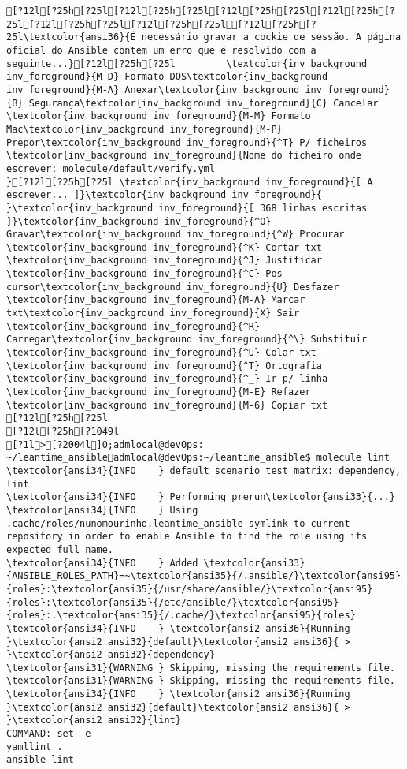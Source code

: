 \documentclass{scrartcl}
\begin{document}
\begin{Verbatim}
[?12l[?25h[?25l[?12l[?25h[?25l[?12l[?25h[?25l[?12l[?25h[?25l[?12l[?25h[?25l[?12l[?25h[?25l[?12l[?25h[?25l\textcolor{ansi36}{É necessário gravar a cockie de sessão. A página oficial do Ansible contem um erro que é resolvido com a seguinte...}[?12l[?25h[?25l         \textcolor{inv_background inv_foreground}{M-D} Formato DOS\textcolor{inv_background inv_foreground}{M-A} Anexar\textcolor{inv_background inv_foreground}{B} Segurança\textcolor{inv_background inv_foreground}{C} Cancelar           \textcolor{inv_background inv_foreground}{M-M} Formato Mac\textcolor{inv_background inv_foreground}{M-P} Prepor\textcolor{inv_background inv_foreground}{^T} P/ ficheiros
\textcolor{inv_background inv_foreground}{Nome do ficheiro onde escrever: molecule/default/verify.yml                                                                               }[?12l[?25h[?25l \textcolor{inv_background inv_foreground}{[ A escrever... ]}\textcolor{inv_background inv_foreground}{          }\textcolor{inv_background inv_foreground}{[ 368 linhas escritas ]}\textcolor{inv_background inv_foreground}{^O} Gravar\textcolor{inv_background inv_foreground}{^W} Procurar      \textcolor{inv_background inv_foreground}{^K} Cortar txt    \textcolor{inv_background inv_foreground}{^J} Justificar    \textcolor{inv_background inv_foreground}{^C} Pos cursor\textcolor{inv_background inv_foreground}{U} Desfazer     \textcolor{inv_background inv_foreground}{M-A} Marcar txt\textcolor{inv_background inv_foreground}{X} Sair    \textcolor{inv_background inv_foreground}{^R} Carregar\textcolor{inv_background inv_foreground}{^\} Substituir    \textcolor{inv_background inv_foreground}{^U} Colar txt     \textcolor{inv_background inv_foreground}{^T} Ortografia    \textcolor{inv_background inv_foreground}{^_} Ir p/ linha   \textcolor{inv_background inv_foreground}{M-E} Refazer      \textcolor{inv_background inv_foreground}{M-6} Copiar txt
[?12l[?25h[?25l
[?12l[?25h[?1049l
[?1l>[?2004l]0;admlocal@devOps: ~/leantime_ansibleadmlocal@devOps:~/leantime_ansible$ molecule lint
\textcolor{ansi34}{INFO    } default scenario test matrix: dependency, lint
\textcolor{ansi34}{INFO    } Performing prerun\textcolor{ansi33}{...}
\textcolor{ansi34}{INFO    } Using .cache/roles/nunomourinho.leantime_ansible symlink to current repository in order to enable Ansible to find the role using its expected full name.
\textcolor{ansi34}{INFO    } Added \textcolor{ansi33}{ANSIBLE_ROLES_PATH}=~\textcolor{ansi35}{/.ansible/}\textcolor{ansi95}{roles}:\textcolor{ansi35}{/usr/share/ansible/}\textcolor{ansi95}{roles}:\textcolor{ansi35}{/etc/ansible/}\textcolor{ansi95}{roles}:.\textcolor{ansi35}{/.cache/}\textcolor{ansi95}{roles}
\textcolor{ansi34}{INFO    } \textcolor{ansi2 ansi36}{Running }\textcolor{ansi2 ansi32}{default}\textcolor{ansi2 ansi36}{ > }\textcolor{ansi2 ansi32}{dependency}
\textcolor{ansi31}{WARNING } Skipping, missing the requirements file.
\textcolor{ansi31}{WARNING } Skipping, missing the requirements file.
\textcolor{ansi34}{INFO    } \textcolor{ansi2 ansi36}{Running }\textcolor{ansi2 ansi32}{default}\textcolor{ansi2 ansi36}{ > }\textcolor{ansi2 ansi32}{lint}
COMMAND: set -e
yamllint .
ansible-lint


\end{Verbatim}
\end{document}
